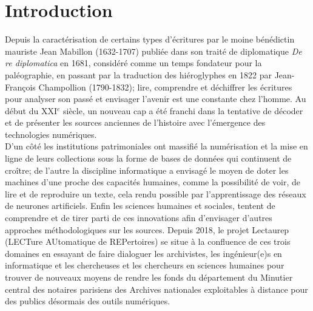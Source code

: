 \part*{Introduction}

Depuis la caractérisation de certains types d'écritures par le moine bénédictin mauriste Jean Mabillon (1632-1707) publiée dans son traité de diplomatique \textit{De re diplomatica} en 1681, considéré comme un temps fondateur pour la paléographie, en passant par la traduction des hiéroglyphes en 1822 par Jean-François Champollion (1790-1832); lire, comprendre et déchiffrer les écritures pour analyser son passé et envisager l'avenir est une constante chez l'homme. Au début du XXI$^{e}$ siècle, un nouveau cap a été franchi dans la tentative de décoder et de présenter les sources anciennes de l'histoire avec l'émergence des technologies numériques.\\

D'un côté les institutions patrimoniales ont massifié la numérisation et la mise en ligne de leurs collections sous la forme de bases de données qui continuent de croître; de l'autre la discipline informatique a envisagé le moyen de doter les machines d'une  proche des capacités humaines, comme la possibilité de voir, de lire et de reproduire un texte, cela rendu possible par l'apprentissage des réseaux de neurones artificiels. Enfin les sciences humaines et sociales, tentent de comprendre et de tirer parti de ces innovations afin d'envisager d'autres approches méthodologiques sur les sources. Depuis 2018, le projet Lectaurep (LECTure AUtomatique de REPertoires) se situe à la confluence de ces trois domaines en essayant de faire dialoguer les archivistes, les ingénieur(e)s en informatique et les chercheuses et les chercheurs en sciences humaines pour trouver de nouveaux moyens de rendre les fonds du département du Minutier central des notaires parisiens des Archives nationales exploitables à distance pour des publics désormais  des outils numériques.\\

